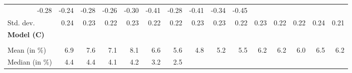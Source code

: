 \begin{tabular}{lllllllllllllll}
  \multicolumn{1}{r}{-0.28} &
  \multicolumn{1}{r}{-0.24} &
  \multicolumn{1}{r}{-0.28} &
  \multicolumn{1}{r}{-0.26} &
  \multicolumn{1}{r}{-0.30} &
  \multicolumn{1}{r}{-0.41} &
  \multicolumn{1}{r}{-0.28} &
  \multicolumn{1}{r}{-0.41} &
  \multicolumn{1}{r}{-0.34} &
  \multicolumn{1}{r}{-0.45} \\
\multicolumn{1}{l}{\hspace{2em}Std. dev.} &
  \multicolumn{1}{|r}{0.24} &
  \multicolumn{1}{r}{0.23} &
  \multicolumn{1}{r}{0.22} &
  \multicolumn{1}{r}{0.23} &
  \multicolumn{1}{r}{0.22} &
  \multicolumn{1}{r}{0.22} &
  \multicolumn{1}{r}{0.23} &
  \multicolumn{1}{r}{0.23} &
  \multicolumn{1}{r}{0.22} &
  \multicolumn{1}{r}{0.23} &
  \multicolumn{1}{r}{0.22} &
  \multicolumn{1}{r}{0.22} &
  \multicolumn{1}{r}{0.24} &
  \multicolumn{1}{r}{0.21} \\
\multicolumn{1}{l}{{\textbf{Model (C)}}} &
  \multicolumn{1}{|r}{} &
  \multicolumn{1}{r}{} &
  \multicolumn{1}{r}{} &
  \multicolumn{1}{r}{} &
  \multicolumn{1}{r}{} &
  \multicolumn{1}{r}{} &
  \multicolumn{1}{r}{} &
  \multicolumn{1}{r}{} &
  \multicolumn{1}{r}{} &
  \multicolumn{1}{r}{} &
  \multicolumn{1}{r}{} &
  \multicolumn{1}{r}{} &
  \multicolumn{1}{r}{} &
  \multicolumn{1}{r}{} \\
\multicolumn{1}{l}{\hspace{1em}{\textit{Additive term} ($\widehat{t}^{add}/\widetilde{p}$)}} &
  \multicolumn{1}{|r}{} &
  \multicolumn{1}{r}{} &
  \multicolumn{1}{r}{} &
  \multicolumn{1}{r}{} &
  \multicolumn{1}{r}{} &
  \multicolumn{1}{r}{} &
  \multicolumn{1}{r}{} &
  \multicolumn{1}{r}{} &
  \multicolumn{1}{r}{} &
  \multicolumn{1}{r}{} &
  \multicolumn{1}{r}{} &
  \multicolumn{1}{r}{} &
  \multicolumn{1}{r}{} &
  \multicolumn{1}{r}{} \\
\multicolumn{1}{l}{\hspace{2em}Mean (in $\%$)} &
  \multicolumn{1}{|r}{6.9} &
  \multicolumn{1}{r}{7.6} &
  \multicolumn{1}{r}{7.1} &
  \multicolumn{1}{r}{8.1} &
  \multicolumn{1}{r}{6.6} &
  \multicolumn{1}{r}{5.6} &
  \multicolumn{1}{r}{4.8} &
  \multicolumn{1}{r}{5.2} &
  \multicolumn{1}{r}{5.5} &
  \multicolumn{1}{r}{6.2} &
  \multicolumn{1}{r}{6.2} &
  \multicolumn{1}{r}{6.0} &
  \multicolumn{1}{r}{6.5} &
  \multicolumn{1}{r}{6.2} \\
\multicolumn{1}{l}{\hspace{2em}Median (in $\%$)} &
  \multicolumn{1}{|r}{4.4} &
  \multicolumn{1}{r}{4.4} &
  \multicolumn{1}{r}{4.1} &
  \multicolumn{1}{r}{4.2} &
  \multicolumn{1}{r}{3.2} &
  \multicolumn{1}{r}{2.5} &

\end{tabular}
